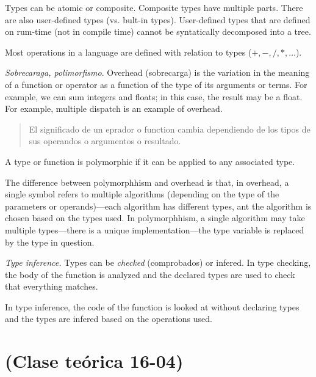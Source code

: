 \documentclass[a4paper, 12pt]{article}
\begin{document}
Types can be atomic or composite. Composite types have multiple parts. There
are also user-defined types (vs. bult-in types). User-defined types that are
defined on rum-time (not in compile time) cannot be syntatically decomposed
into a tree.

Most operations in a language are defined with relation to types ($+, -, /, *,
\ldots$).

\textit{Sobrecaraga, polimorfismo}. Overhead (sobrecarga) is the variation in 
the meaning of a function or operator as a function of the type of its 
arguments or terms. For example, we can sum integers and floats; in 
this case, the result may be a float.  For example, multiple dispatch 
is an example of overhead.


\small
\begin{quote}

El significado de un eprador o function cambia dependiendo de los tipos 
de sus operandos o argumentos o resultado.

\end{quote}
\normalsize

A type or function is polymorphic if it can be applied to any associated type.

The difference between polymorphhism and overhead is that, in overhead, a
single symbol refers to multiple algorithms (depending on the type of the
parameters or operands)---each algorithm has different types, ant the algorithm
is chosen based on the types used. In polymorphhism, a single algorithm may
take multiple types---there is a unique implementation---the type variable is
replaced by the type in question.


\textit{Type inference.} Types can be \textit{checked} (comprobados) or
infered. In type checking, the body of the function is analyzed and the
declared types are used to check that everything matches. 

In type inference, the code of the function is looked at without declaring
types and the types are infered based on the operations used.

\pagebreak 

\section{ (Clase teórica 16-04)}
\end{document}
